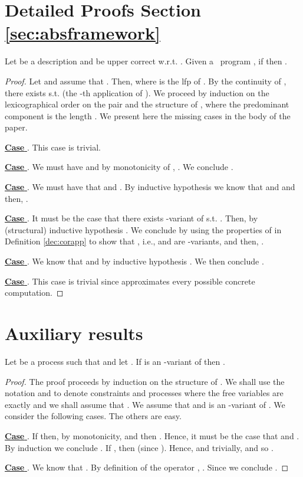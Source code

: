 \documentclass{tlp}
\begin{document}
\section{Detailed Proofs Section \ref{sec:absframework}} \label{app-sec-abs}
{
Let   be a description and     be upper correct w.r.t. .   Given a  \utcc\ program , if 
 then  .  
}
\begin{proof} 
Let  and assume that . Then,  where  is the lfp of . By the continuity of ,  there exists  s.t.   (the -th application of ). 
We proceed by  induction on the lexicographical order on 
the pair  and the structure of , where the predominant component is the length . We present here the missing cases in the body of the paper. 

\noindent \underline{{\bf Case}  }. This case is trivial.


\noindent \underline{{\bf Case}   }. We must have  and by monotonicity of ,  . We conclude  .


\noindent \underline{{\bf Case}   }. We must have that 
	and .  By inductive hypothesis we know that
	 and
	 and then,
	.



\noindent \underline{{\bf Case}   }. It must be the case that there exists  -variant of  s.t.
		. Then,  by (structural) inductive hypothesis . We conclude by using the properties of  in Definition \ref{dec:corapp} to show that , i.e.,  and  are -variants, and then, . 


\noindent \underline{{\bf Case}   }. 
	We know that  and by inductive hypothesis
	. We then conclude . 
	
\noindent \underline{{\bf Case}   }. This case is trivial since  approximates every possible concrete computation.
\end{proof}

\section{Auxiliary results} \label{app:proofs-aux}
\begin{proposition}\label{prop:x-variants-free-vars}
Let  be a process such that    and let . If    is an -variant of  then . 
\end{proposition}
\begin{proof}
	The proof proceeds  by induction on the structure of . We shall use the notation  and  to denote constraints and processes where the free variables are exactly  and we shall assume that . We assume that  and  is an -variant of . 
 We consider the following cases.  The others are easy. 

\noindent \underline{{\bf Case}  }. If  then, by monotonicity,  and then . Hence, it must be the case that  and  .  By induction we conclude . If , then  (since ). Hence,  and trivially,  and so . 

\noindent \underline{{\bf Case} }. 
			We know that 
		. 
		By definition of the operator , . Since    we conclude . 
\end{proof}
\end{document}
